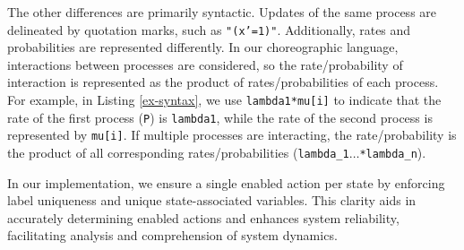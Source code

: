 The other differences are primarily syntactic. Updates of the same process are delineated by quotation marks, such as \texttt{"(x'=1)"}. Additionally, rates and probabilities are represented differently. In our choreographic language, interactions between processes are considered, so the rate/probability of interaction is represented as the product of rates/probabilities of each process. For example, in Listing \ref{ex-syntax}, we use \texttt{lambda1*mu[i]} to indicate that the rate of the first process (\texttt{P}) is \texttt{lambda1}, while the rate of the second process is represented by \texttt{mu[i]}. If multiple processes are interacting, the rate/probability is the product of all corresponding rates/probabilities (\texttt{lambda\_1$\ldots$*lambda\_n}).

In our implementation, we ensure a single enabled action per state by enforcing label uniqueness and unique state-associated variables. This clarity aids in accurately determining enabled actions and enhances system reliability, facilitating analysis and comprehension of system dynamics.